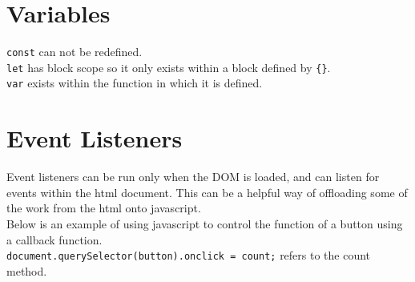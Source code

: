 \documentclass[]{book}
\begin{document}
\section{Variables}\label{variables}

\texttt{const} can not be redefined.\\
\texttt{let} has block scope so it only exists within a block defined by
\texttt{\{\}}.\\
\texttt{var} exists within the function in which it is defined.

\section{Event Listeners}\label{event-listeners}

Event listeners can be run only when the DOM is loaded, and can listen
for events within the html document. This can be a helpful way of
offloading some of the work from the html onto javascript.\\
Below is an example of using javascript to control the function of a
button using a callback function.\\
\texttt{document.querySelector(\textquotesingle{}button\textquotesingle{}).onclick\ =\ count;}
refers to the count method.
\end{document}
